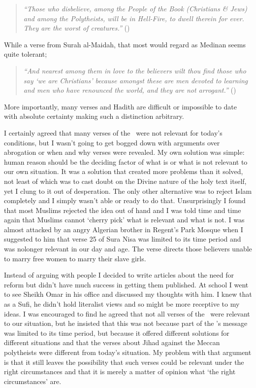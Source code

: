 \documentclass[12pt]{memoir}
\begin{document}
\begin{quote}
\emph{“Those who disbelieve, among the People of the Book (Christians \& Jews)
and among the Polytheists, will be in Hell-Fire, to dwell therein for ever.
They are the worst of creatures.”}
()
\end{quote}

While a verse from Surah al-Ma\´idah, that most would regard
as Medinan seems quite tolerant;

\begin{quote}
\emph{“And nearest among them in love to the believers wilt thou find those
who say ‘we are Christians’ because amongst these are men devoted to learning
and men who have renounced the world, and they are not arrogant.”}
()
\end{quote}

More importantly, many verses and Hadith are difficult or impossible
to date with absolute certainty making such a distinction arbitrary.

I certainly agreed that many verses of the \Quran\ were not relevant
for today’s conditions, but I wasn’t going to get bogged down
with arguments over abrogation or when and why verses were revealed.
My own solution was simple:
human reason should be the deciding factor of what is
or what is not relevant to our own situation.
It was a solution that created more problems than it solved,
not least of which was to cast doubt on the Divine nature
of the holy text itself, yet  I clung to it out of desperation.
The only other alternative was to reject Islam completely
and I simply wasn’t able or ready to do that.
Unsurprisingly I found that most Muslims rejected the idea out of hand
and I was told time and time again that Muslims
cannot ‘cherry pick’ what is relevant and what is not.
I was almost attacked by an angry Algerian brother in Regent’s Park Mosque
when I suggested to him that verse 25 of Sura Nisa was limited
to its time period and was no\cor{-}{ }longer
relevant in our day and age.
The verse directs those believers unable to marry free women
to marry their slave girls.

Instead of arguing with people I decided to write articles about the need
for reform but didn’t have much success in getting them published.
At school I went to see Sheikh Omar in his office
and discussed my thoughts with him.
I knew that as a Sufi, he didn’t hold literalist views
and so might be more receptive to my ideas.
I was encouraged to find he agreed that not all verses of the \Quran\
were relevant to our situation, but he insisted that this
was not because part of the \Quran’s message was limited to its time period,
but because it offered different solutions for different situations
and that the verses about Jihad against the Meccan polytheists
were different from today’s situation.
My problem with that argument is that it still leaves the possibility
that such verses could be relevant under the right circumstances
and that it is merely a matter of opinion what ‘the right circumstances’ are.
\end{document}
